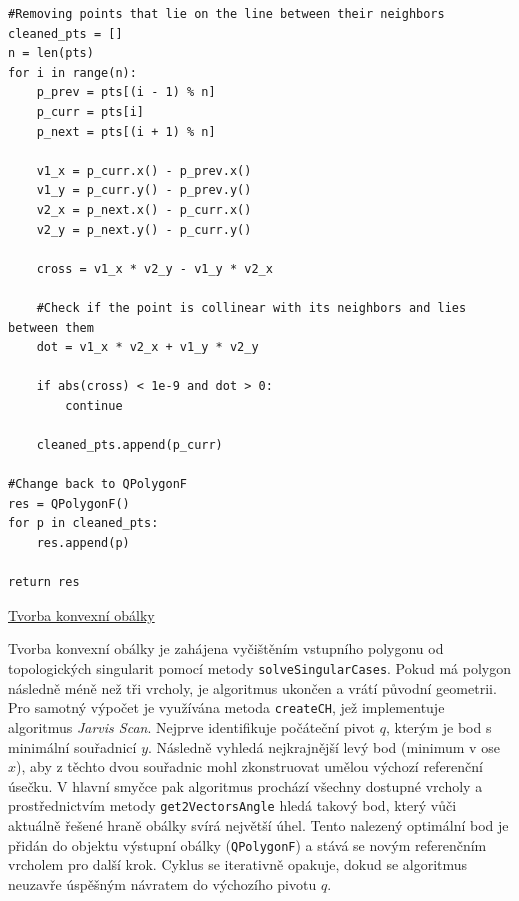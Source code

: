 \documentclass[12pt]{article}
\begin{document}
\newpage
\begin{lstlisting}[caption = Ukázka z funkce solveSingularCases]
#Removing points that lie on the line between their neighbors
cleaned_pts = []
n = len(pts)
for i in range(n):
    p_prev = pts[(i - 1) % n]
    p_curr = pts[i]
    p_next = pts[(i + 1) % n]

    v1_x = p_curr.x() - p_prev.x()
    v1_y = p_curr.y() - p_prev.y()
    v2_x = p_next.x() - p_curr.x()
    v2_y = p_next.y() - p_curr.y()

    cross = v1_x * v2_y - v1_y * v2_x
    
    #Check if the point is collinear with its neighbors and lies between them
    dot = v1_x * v2_x + v1_y * v2_y

    if abs(cross) < 1e-9 and dot > 0:
        continue
    
    cleaned_pts.append(p_curr)

#Change back to QPolygonF
res = QPolygonF()
for p in cleaned_pts:
    res.append(p)
    
return res
\end{lstlisting}

\newpage

\underline{Tvorba konvexní obálky}

Tvorba konvexní obálky je zahájena vyčištěním vstupního polygonu od topologických singularit pomocí metody \texttt{solveSingularCases}. Pokud má polygon následně méně než tři vrcholy, je algoritmus ukončen a vrátí původní geometrii. Pro samotný výpočet je využívána metoda \texttt{createCH}, jež implementuje algoritmus \emph{Jarvis Scan}. Nejprve identifikuje počáteční pivot $q$, kterým je bod s minimální souřadnicí $y$. Následně vyhledá nejkrajnější levý bod (minimum v ose $x$), aby z těchto dvou souřadnic mohl zkonstruovat umělou výchozí referenční úsečku. V hlavní smyčce pak algoritmus prochází všechny dostupné vrcholy a prostřednictvím metody \texttt{get2VectorsAngle} hledá takový bod, který vůči aktuálně řešené hraně obálky svírá největší úhel. Tento nalezený optimální bod je přidán do objektu výstupní obálky (\texttt{QPolygonF}) a stává se novým referenčním vrcholem pro další krok. Cyklus se iterativně opakuje, dokud se algoritmus neuzavře úspěšným návratem do výchozího pivotu $q$. 
\end{document}
